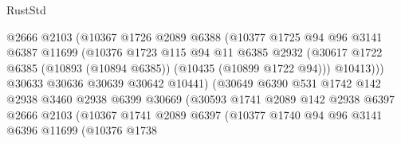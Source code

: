 \begin{lexlean}{RustStd}
\begin{coremodule}
                                @2666
                                @2103
                                (@10367
                                  @1726
                                  @2089
                                  @6388
                                  (@10377
                                    @1725
                                    @94
                                    @96
                                    @3141
                                    @6387
                                    @11699
                                    (@10376
                                      @1723
                                      @115
                                      @94
                                      @11
                                      @6385
                                      @2932
                                      (@30617
                                        @1722
                                        @6385
                                        (@10893 (@10894 @6385))
                                        (@10435 (@10899 @1722 @94)))
                                      @10413)))
                                @30633
                                @30636
                                @30639
                                @30642
                                @10441)
                              (@30649
                                @6390
                                @531
                                @1742
                                @142
                                @2938
                                @3460
                                @2938
                                @6399
                                @30669
                                (@30593
                                  @1741
                                  @2089
                                  @142
                                  @2938
                                  @6397
                                  @2666
                                  @2103
                                  (@10367
                                    @1741
                                    @2089
                                    @6397
                                    (@10377
                                      @1740
                                      @94
                                      @96
                                      @3141
                                      @6396
                                      @11699
                                      (@10376
                                        @1738

\end{coremodule}
\end{lexlean}
